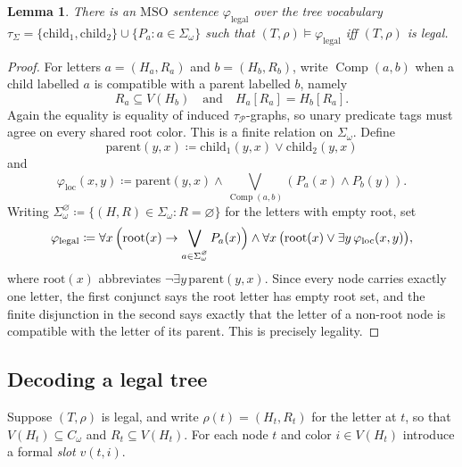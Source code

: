 \documentclass[11pt]{article}
\newtheorem{lemma}[theorem]{Lemma}
\theoremstyle{definition}
\newcommand{\MSO}{\ensuremath{\mathrm{MSO}}}
\newcommand{\defeq}{\coloneqq}
\newcommand{\child}{\mathrm{child}}
\newcommand{\parent}{\mathrm{parent}}
\newcommand{\rootnode}{\mathrm{root}}
\newcommand{\legal}{\mathrm{legal}}
\newcommand{\Pred}{\mathcal P}
\begin{document}
\begin{lemma}
There is an \MSO{} sentence \(\varphi_{\legal}\) over the tree vocabulary
\(\tau_\Sigma=\{\child_1,\child_2\}\cup\{P_a:a\in\Sigma_\omega\}\) such that
\((T,\rho)\models\varphi_{\legal}\) iff \((T,\rho)\) is legal.
\end{lemma}

\begin{proof}
For letters \(a=(H_a,R_a)\) and \(b=(H_b,R_b)\), write
\(\operatorname{Comp}(a,b)\) when a child labelled \(a\) is compatible with a
parent labelled \(b\), namely
\[
  R_a\subseteq V(H_b)\quad\text{and}\quad H_a[R_a]=H_b[R_a].
\]
Again the equality is equality of induced \(\tau_{\Pred}\)-graphs, so unary
predicate tags must agree on every shared root color.  This is a finite relation
on \(\Sigma_\omega\).  Define
\[
  \parent(y,x) \defeq \child_1(y,x)\vee \child_2(y,x)
\]
and
\[
  \varphi_{\operatorname{loc}}(x,y)
  \defeq
  \parent(y,x)\wedge
  \bigvee_{\operatorname{Comp}(a,b)}(P_a(x)\wedge P_b(y)).
\]
Writing \(\Sigma_\omega^{\varnothing}\defeq\{(H,R)\in\Sigma_\omega:R=\varnothing\}\)
for the letters with empty root, set
\[
  \varphi_{\legal}
  \defeq
  \forall x\,\Bigl(\rootnode(x)\to\bigvee_{a\in\Sigma_\omega^{\varnothing}}P_a(x)\Bigr)
  \wedge
  \forall x\,\bigl(\rootnode(x)\vee \exists y\,\varphi_{\operatorname{loc}}(x,y)\bigr),
\]
where \(\rootnode(x)\) abbreviates \(\neg\exists y\,\parent(y,x)\).  Since every
node carries exactly one letter, the first conjunct says the root letter has
empty root set, and the finite disjunction in the second says exactly that the
letter of a non-root node is compatible with the letter of its parent.  This is
precisely legality.
\end{proof}

\subsection{Decoding a legal tree}

Suppose \((T,\rho)\) is legal, and write \(\rho(t)=(H_t,R_t)\) for the letter at
\(t\), so that \(V(H_t)\subseteq C_\omega\) and \(R_t\subseteq V(H_t)\).  For each
node \(t\) and color \(i\in V(H_t)\) introduce a formal \emph{slot} \(v(t,i)\).
\end{document}
